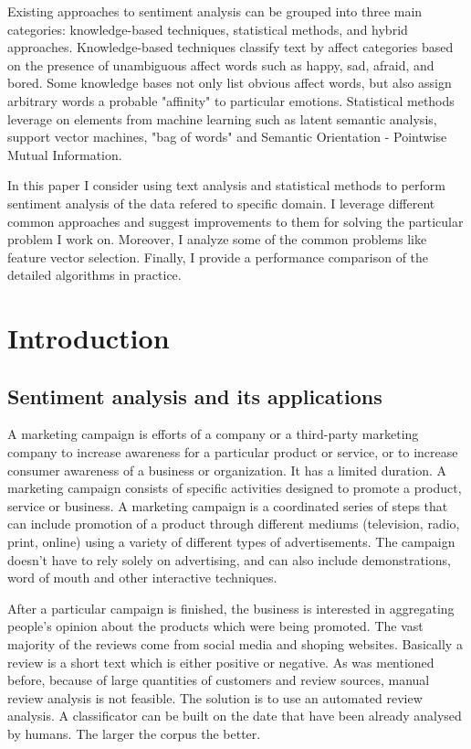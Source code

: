 \documentclass[12pt]{report}
\begin{document}
Existing approaches to sentiment analysis can be grouped into three main categories: knowledge-based techniques, statistical methods, and hybrid approaches. Knowledge-based techniques classify text by affect categories based on the presence of unambiguous affect words such as happy, sad, afraid, and bored. Some knowledge bases not only list obvious affect words, but also assign arbitrary words a probable "affinity" to particular emotions. Statistical methods leverage on elements from machine learning such as latent semantic analysis, support vector machines, "bag of words" and Semantic Orientation - Pointwise Mutual Information.

In this paper I consider using text analysis and statistical methods to perform sentiment analysis of the data refered to specific domain. I leverage different common approaches and suggest improvements to them for solving the particular problem I work on. Moreover, I analyze some of the common problems like feature vector selection. Finally, I provide a performance comparison of the detailed algorithms in practice.

\newpage


\chapter{Introduction}

\section{Sentiment analysis and its applications}

A marketing campaign is efforts of a company or a third-party marketing company to increase awareness for a particular product or service, or to increase consumer awareness of a business or organization. It has a limited duration. A marketing campaign consists of specific activities designed to promote a product, service or business. A marketing campaign is a coordinated series of steps that can include promotion of a product through different mediums (television, radio, print, online) using a variety of different types of advertisements. The campaign doesn't have to rely solely on advertising, and can also include demonstrations, word of mouth and other interactive techniques.

After a particular campaign is finished, the business is interested in aggregating people's opinion about the products which were being promoted. The vast majority of the reviews come from social media and shoping websites. Basically a review is a short text which is either positive or negative. As was mentioned before, because of large quantities of customers and review sources, manual review analysis is not feasible. The solution is to use an automated review analysis. A classificator can be built on the date that have been already analysed by humans. The larger the corpus the better.
\end{document}
